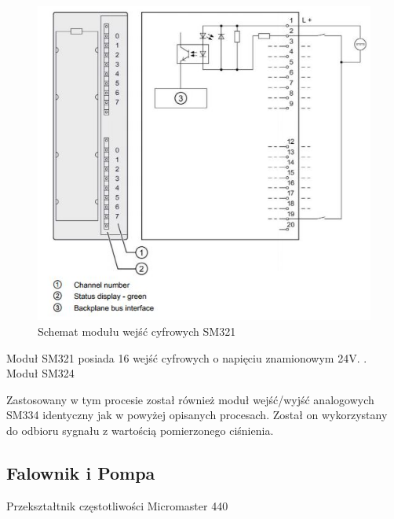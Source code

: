 \begin{figure}[h]
\centering
\includegraphics[scale=0.8]{Zdjecia/Stanowiska/4_Pompa/SM321_sch.jpg}
\caption{Schemat modułu wejść cyfrowych SM321}
\end{figure}

Moduł SM321 posiada 16 wejść cyfrowych o napięciu znamionowym 24V.
\cite{diduce:S7-300}.\\
\newpage
{}\selectfont
Moduł SM324
\selectfont

Zastosowany w tym procesie został również moduł wejść/wyjść analogowych SM334 identyczny jak w powyżej opisanych procesach. Został on wykorzystany do odbioru sygnału z wartością pomierzonego ciśnienia.
\subsection{Falownik i Pompa}
\selectfont
Przekształtnik częstotliwości Micromaster 440
\selectfont

